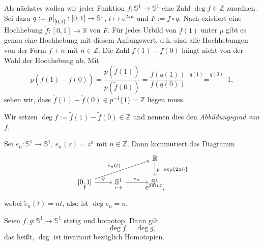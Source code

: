 \documentclass[
12pt, 
openany, 
a4paper, 
final,
fleqn, 
]{myclass}
\numberwithin{equation}{chapter}
\numberwithin{section}{chapter}
\newcommand{\ZZ}{\mathbb Z}
\newcommand{\RR}{\mathbb R}
\newcommand{\Ss}{\mathbb S}
\newcommand{\eval}[1]{\left. \vphantom{\int}#1\right\lvert}
\begin{document}
Als nächstes wollen wir jeder Funktion $ f:\Ss^1 \to \Ss^1 $ eine Zahl $ \deg f\in \ZZ $ zuordnen. Sei dazu $ q:=\eval{p}_{[0,1]}:[0,1]\to\mathbb{S}^{1} $, $ t\mapsto \mathrm{e}^{2\pi\mathrm{i}t} $ und $ F:= f\circ q $. Nach  existiert eine Hochhebung $ \tilde f:[0,1]\to \RR $ von $ F $. Für jedes Urbild von $ f(1) $ unter $ p $ gibt es genau eine Hochhebung mit diesem Anfangswert, d.h. sind alle Hochhebungen von der Form $ \tilde f + n $ mit $ n\in \ZZ $. Die Zahl $ \tilde f(1) - \tilde f(0) $ hängt nicht von der Wahl der Hochhebung ab. Mit
\[
p\left(\tilde f(1)- \tilde f(0)\right) = \frac{p(\tilde f(1))}{p(\tilde f(0))} = \frac{f(q(1))}{f(q(0))} \overset{\substack{q(1)=q(0)}}{=} 1, 
\]
sehen wir, dass $ \tilde f(1) - \tilde f(0) \in p^{-1}\{1\} = \mathbb{Z}$ liegen muss. 
\begin{defn}\label{5.2}
Wir setzen $ \deg f := \tilde f(1) - \tilde f(0) \in \ZZ $ und nennen dies den \emph{Abbildungsgrad von $ f $. }
\end{defn}

\begin{eg}\label{5.3}
Sei $ e_{n}: \mathbb{S}^{1}\to \mathbb{S}^{1} $, $ e_{n}(z)= z^{n} $ mit $ n\in \ZZ $. Dann kommutiert das Diagramm 
\[ 
\begin{tikzcd}
& &  \RR \arrow{d}{p = \exp\left\{2\pi\mathrm{i}\cdot \right\}}\\
\text{$ [0,1] $} \arrow{urr}{\tilde e_{n}(t)}\arrow{r}{q}	& \Ss^{1} \arrow{r}{e_{n}} & \Ss^{1}\\[-10mm]
t & \mapsto & \mathrm{e}^{2\pi\mathrm{i}nt}, 
\end{tikzcd}
\]
wobei $ \tilde e_{n}(t)= nt $, also ist $ \deg e_{n} = n $. 
\end{eg}

\begin{thr}\label{5.4}
Seien $ f, g: \Ss^1 \to \Ss^1 $ stetig und homotop. Dann gilt
\[
\deg f = \deg g, 
\]
das heißt, $ \deg $ ist invariant bezüglich Homotopien. 
\end{thr}
\end{document}
